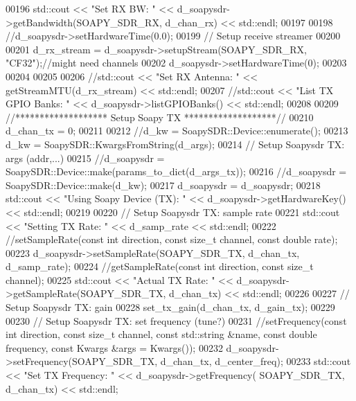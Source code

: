 \begin{DoxyCode}
00196       std::cout << \textcolor{stringliteral}{"Set RX BW: "}  << d_soapysdr->getBandwidth(SOAPY_SDR_RX, 
      d_chan_rx) << std::endl;
00197 
00198       \textcolor{comment}{//d\_soapysdr->setHardwareTime(0.0);}
00199       \textcolor{comment}{// Setup receive streamer}
00200 
00201       d_rx_stream = d_soapysdr->setupStream(SOAPY_SDR_RX, \textcolor{stringliteral}{"CF32"});\textcolor{comment}{//might need channels}
00202       d_soapysdr->setHardwareTime(0);
00203 
00204 
00205 
00206       \textcolor{comment}{//std::cout << "Set RX Antenna: " << getStreamMTU(d\_rx\_stream) << std::endl;}
00207       \textcolor{comment}{//std::cout << "List TX GPIO Banks: " << d\_soapysdr->listGPIOBanks() << std::endl;}
00208 
00209       \textcolor{comment}{//******************* Setup Soapy TX *******************//}
00210       d_chan_tx = 0;
00211 
00212       \textcolor{comment}{//d\_kw = SoapySDR::Device::enumerate();}
00213       d_kw = SoapySDR::KwargsFromString(d_args);
00214       \textcolor{comment}{// Setup Soapysdr TX: args (addr,...)}
00215       \textcolor{comment}{//d\_soapysdr = SoapySDR::Device::make(params\_to\_dict(d\_args\_tx));}
00216       \textcolor{comment}{//d\_soapysdr = SoapySDR::Device::make(d\_kw);}
00217       d_soapysdr = d_soapysdr;
00218       std::cout << \textcolor{stringliteral}{"Using Soapy Device (TX): "}  << d_soapysdr->getHardwareKey() << std::endl;
00219 
00220       \textcolor{comment}{// Setup Soapysdr TX: sample rate}
00221       std::cout << \textcolor{stringliteral}{"Setting TX Rate: "} << d_samp_rate << std::endl;
00222       \textcolor{comment}{//setSampleRate(const int direction, const size\_t channel, const double rate);}
00223       d_soapysdr->setSampleRate(SOAPY_SDR_TX, d_chan_tx, d_samp_rate);
00224       \textcolor{comment}{//getSampleRate(const int direction, const size\_t channel);}
00225       std::cout << \textcolor{stringliteral}{"Actual TX Rate: "} << d_soapysdr->getSampleRate(SOAPY_SDR_TX, 
      d_chan_tx) << std::endl;
00226 
00227       \textcolor{comment}{// Setup Soapysdr TX: gain}
00228       set_tx_gain(d_chan_tx, d_gain_tx);
00229 
00230       \textcolor{comment}{// Setup Soapysdr TX: set frequency (tune?)}
00231       \textcolor{comment}{//setFrequency(const int direction, const size\_t channel, const std::string &name, const double
       frequency, const Kwargs &args = Kwargs());}
00232       d_soapysdr->setFrequency(SOAPY_SDR_TX, d_chan_tx, d_center_freq);
00233       std::cout << \textcolor{stringliteral}{"Set TX Frequency: "}  << d_soapysdr->getFrequency(
      SOAPY_SDR_TX, d_chan_tx) << std::endl;

\end{DoxyCode}

